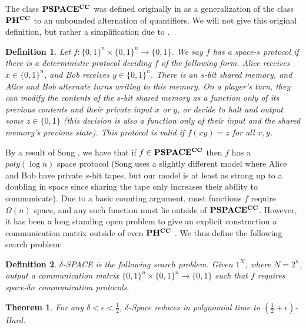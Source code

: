 \documentclass[11pt]{article}
\newtheorem{theorem}{Theorem}
\newtheorem{definition}{Definition}
\def\cl{\bf}
\begin{document}
The class ${\cl PSPACE^{CC}}$ was defined originally in \cite{communication-classes} as a generalization of the class ${\cl PH^{CC}}$ to an unbounded alternation of quantifiers. We will not give this original definition, but rather a simplification due to \cite{space-communication}.

\begin{definition}
Let $f: \{0,1\}^n \times \{0,1\}^n \rightarrow \{0,1\}$. We say $f$ has a space-$s$ protocol if there is a deterministic protocol deciding $f$ of the following form. Alice receives $x \in \{0,1\}^n$, and Bob receives $y \in \{0,1\}^n$. There is an $s$-bit shared memory, and Alice and Bob alternate turns writing to this memory. On a player's turn, they can modify the contents of the $s$-bit shared memory as a function only of its previous contents and their private input $x$ or $y$, or decide to halt and output some $z \in \{0,1\}$ (this decision is also a function only of their input and the shared memory's previous state). This protocol is valid if $f(xy) = z$ for all $x,y$.
\end{definition}


By a result of Song \cite{space-communication}, we have that if $f  \in {\cl PSPACE^{CC}}$ then $f$ has a $poly(\log n)$ space protocol (Song uses a slightly different model where Alice and Bob have private $s$-bit tapes, but our model is at least as strong up to a doubling in space since sharing the tape only increases their ability to communicate). Due to a basic counting argument, most functions $f$ require $\Omega(n)$ space, and any such function must lie outside of $ {\cl PSPACE^{CC}}$. However, it has been a long standing open problem to give an explicit construction a communication matrix outside of even ${\cl PH^{CC}}$ \cite{space-communication}. We thus define the following search problem:

\begin{definition}
{\sc $\delta$-SPACE} is the following search problem. Given $1^N$, where $N=2^n$, output a communication matrix $\{0,1\}^n \times \{0,1\}^n \rightarrow \{0,1\}$ such that $f$ requires space-$\delta n$ communication protocols.
\end{definition}

\begin{theorem}\label{thm:space-circuit}
For any $\delta < \epsilon < \frac{1}{2}$, {\sc $\delta$-Space} reduces in polynomial time to {\sc $(\frac{1}{2} + \epsilon)$-Hard}.
\end{theorem}
\end{document}
